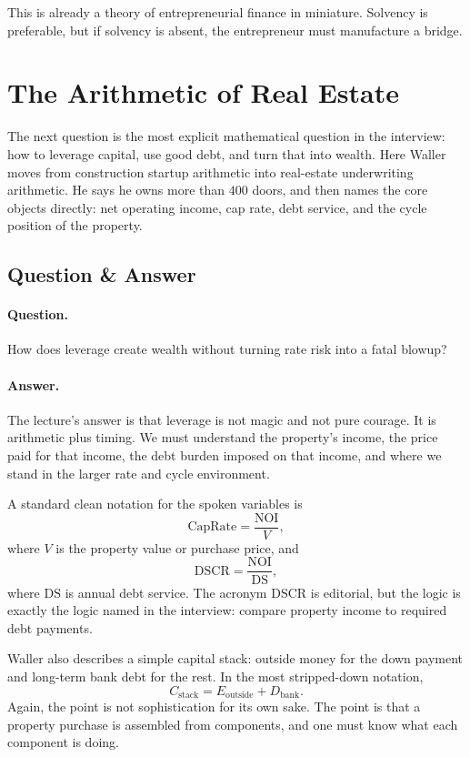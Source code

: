 This is already a theory of entrepreneurial finance in miniature. Solvency is preferable, but if solvency is absent, the entrepreneur must manufacture a bridge.

\section{The Arithmetic of Real Estate}

The next question is the most explicit mathematical question in the interview: how to leverage capital, use good debt, and turn that into wealth. Here Waller moves from construction startup arithmetic into real-estate underwriting arithmetic. He says he owns more than \(400\) doors, and then names the core objects directly: net operating income, cap rate, debt service, and the cycle position of the property.

\subsection{Question \& Answer}

\paragraph{Question.} How does leverage create wealth without turning rate risk into a fatal blowup?

\paragraph{Answer.} The lecture's answer is that leverage is not magic and not pure courage. It is arithmetic plus timing. We must understand the property's income, the price paid for that income, the debt burden imposed on that income, and where we stand in the larger rate and cycle environment.

A standard clean notation for the spoken variables is
\begin{equation}
\mathrm{CapRate} = \frac{\mathrm{NOI}}{V},
\end{equation}
where \(V\) is the property value or purchase price, and
\begin{equation}
\mathrm{DSCR} = \frac{\mathrm{NOI}}{\mathrm{DS}},
\end{equation}
where \(\mathrm{DS}\) is annual debt service. The acronym \(\mathrm{DSCR}\) is editorial, but the logic is exactly the logic named in the interview: compare property income to required debt payments.

Waller also describes a simple capital stack: outside money for the down payment and long-term bank debt for the rest. In the most stripped-down notation,
\begin{equation}
C_{\text{stack}} = E_{\text{outside}} + D_{\text{bank}}.
\end{equation}
Again, the point is not sophistication for its own sake. The point is that a property purchase is assembled from components, and one must know what each component is doing.

